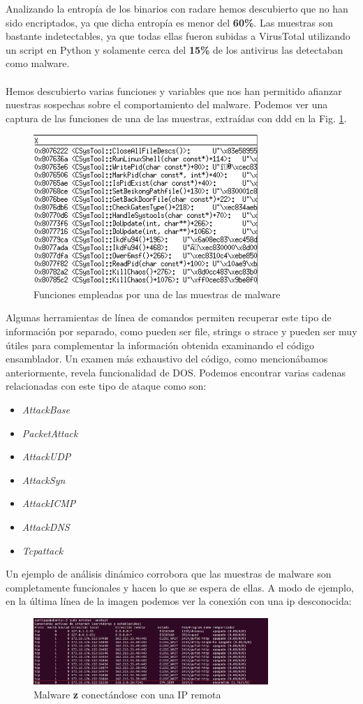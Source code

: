 \documentclass[journal]{IEEEtran}
\begin{document}
Analizando la entropía de los binarios con radare hemos descubierto que no han sido encriptados, ya que dicha entropía es menor del \textbf{60\%}. Las muestras son bastante indetectables, ya que todas ellas fueron subidas a VirusTotal utilizando un script en Python y solamente cerca del \textbf{15\%} de los antivirus las detectaban como malware.
\\\\
Hemos descubierto varias funciones y variables que nos han permitido afianzar nuestras sospechas sobre el comportamiento del malware. Podemos ver una captura de las funciones de una de las muestras, extraídas con ddd en la Fig. \ref{fig:ddd}.
\begin{figure}[H]
\centerline{
\includegraphics[width=8.5cm]{img/ddd}
}
\caption{Funciones empleadas por una de las muestras de malware}
\label{fig:ddd}
\end{figure}
Algunas herramientas de línea de comandos permiten recuperar este tipo de información por separado, como pueden ser file, strings o strace y pueden ser muy útiles para complementar la información obtenida examinando el código ensamblador. Un examen más exhaustivo del código, como mencionábamos anteriormente, revela funcionalidad de DOS. Podemos encontrar varias cadenas relacionadas con este tipo de ataque como son:
\begin{itemize}
\item \textit{AttackBase}
\item \textit{PacketAttack}
\item \textit{AttackUDP}
\item \textit{AttackSyn}
\item \textit{AttackICMP}
\item \textit{AttackDNS}
\item \textit{Tcpattack}
\end{itemize}
Un ejemplo de análisis dinámico corrobora que las muestras de malware son completamente funcionales y hacen lo que se espera de ellas. A modo de ejemplo, en la última línea de la imagen podemos ver la conexión con una ip desconocida:
\begin{figure}[H]
\centerline{
\includegraphics[width=8.9cm]{img/netstat}
}
\caption{Malware \textbf{z} conectándose con una IP remota}
\label{fig:netstat}
\end{figure}
\end{document}
